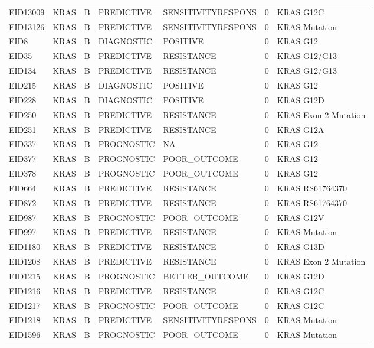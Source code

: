 \begin{footnotesize}
\begin{longtable}{llllllp{4.2cm}}
EID13009 & KRAS & B & PREDICTIVE & SENSITIVITYRESPONS & 0 & KRAS G12C \\
EID13126 & KRAS & B & PREDICTIVE & SENSITIVITYRESPONS & 0 & KRAS Mutation \\
EID8 & KRAS & B & DIAGNOSTIC & POSITIVE & 0 & KRAS G12 \\
EID35 & KRAS & B & PREDICTIVE & RESISTANCE & 0 & KRAS G12/G13 \\
EID134 & KRAS & B & PREDICTIVE & RESISTANCE & 0 & KRAS G12/G13 \\
EID215 & KRAS & B & DIAGNOSTIC & POSITIVE & 0 & KRAS G12 \\
EID228 & KRAS & B & DIAGNOSTIC & POSITIVE & 0 & KRAS G12D \\
EID250 & KRAS & B & PREDICTIVE & RESISTANCE & 0 & KRAS Exon 2 Mutation \\
EID251 & KRAS & B & PREDICTIVE & RESISTANCE & 0 & KRAS G12A \\
EID337 & KRAS & B & PROGNOSTIC & NA & 0 & KRAS G12 \\
EID377 & KRAS & B & PROGNOSTIC & POOR\_OUTCOME & 0 & KRAS G12 \\
EID378 & KRAS & B & PROGNOSTIC & POOR\_OUTCOME & 0 & KRAS G12 \\
EID664 & KRAS & B & PREDICTIVE & RESISTANCE & 0 & KRAS RS61764370 \\
EID872 & KRAS & B & PREDICTIVE & RESISTANCE & 0 & KRAS RS61764370 \\
EID987 & KRAS & B & PROGNOSTIC & POOR\_OUTCOME & 0 & KRAS G12V \\
EID997 & KRAS & B & PREDICTIVE & RESISTANCE & 0 & KRAS Mutation \\
EID1180 & KRAS & B & PREDICTIVE & RESISTANCE & 0 & KRAS G13D \\
EID1208 & KRAS & B & PREDICTIVE & RESISTANCE & 0 & KRAS Exon 2 Mutation \\
EID1215 & KRAS & B & PROGNOSTIC & BETTER\_OUTCOME & 0 & KRAS G12D \\
EID1216 & KRAS & B & PREDICTIVE & RESISTANCE & 0 & KRAS G12C \\
EID1217 & KRAS & B & PROGNOSTIC & POOR\_OUTCOME & 0 & KRAS G12C \\
EID1218 & KRAS & B & PREDICTIVE & SENSITIVITYRESPONS & 0 & KRAS Mutation \\
EID1596 & KRAS & B & PROGNOSTIC & POOR\_OUTCOME & 0 & KRAS Mutation \\
\end{longtable}\end{footnotesize}
